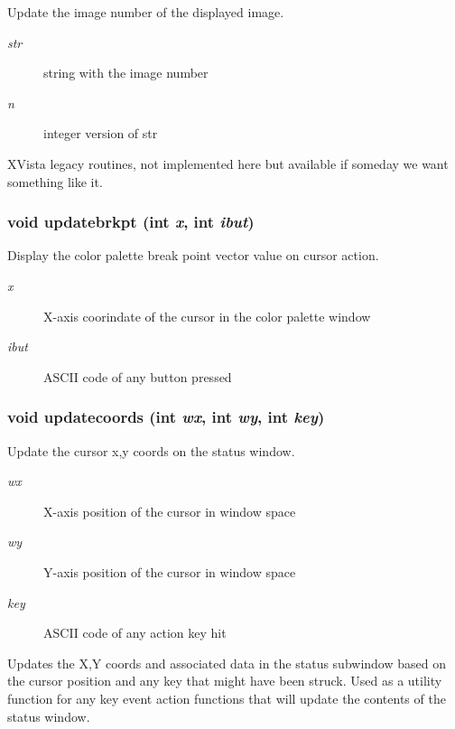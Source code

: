 Update the image number of the displayed image. 

\begin{Desc}
\item[Parameters:]
\begin{description}
\item[{\em str}]string with the image number \item[{\em n}]integer version of str\end{description}
\end{Desc}
XVista legacy routines, not implemented here but available if someday we want something like it. 
\subsubsection{\setlength{\rightskip}{0pt plus 5cm}void updatebrkpt (int {\em x}, int {\em ibut})}\label{xtvutils_8c_a198}


Display the color palette break point vector value on cursor action. 

\begin{Desc}
\item[Parameters:]
\begin{description}
\item[{\em x}]X-axis coorindate of the cursor in the color palette window \item[{\em ibut}]ASCII code of any button pressed \end{description}
\end{Desc}
\subsubsection{\setlength{\rightskip}{0pt plus 5cm}void updatecoords (int {\em wx}, int {\em wy}, int {\em key})}\label{xtvutils_8c_a197}


Update the cursor x,y coords on the status window. 

\begin{Desc}
\item[Parameters:]
\begin{description}
\item[{\em wx}]X-axis position of the cursor in window space \item[{\em wy}]Y-axis position of the cursor in window space \item[{\em key}]ASCII code of any action key hit\end{description}
\end{Desc}
Updates the X,Y coords and associated data in the status subwindow based on the cursor position and any key that might have been struck. Used as a utility function for any key event action functions that will update the contents of the status window. 
